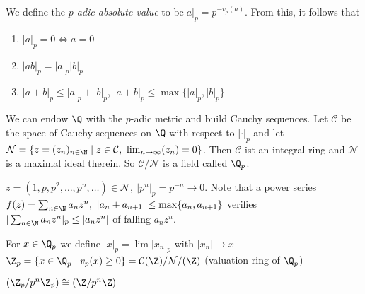 \documentclass{jvfscript}
\begin{document}
	\begin{defn}
		We define the \emph{$p$-adic absolute value} to be$ |a|_p = p^{-v_p(a)} $. From this, it follows that
		\begin{enumerate}
			\item $|a|_p = 0 \iff a = 0$
			\item $ |ab|_p = |a|_p |b|_p $
			\item $|a+b|_p \leq |a|_p+|b|_p$, $|a+b|_p \leq \max\{|a|_p,|b|_p\}$
		\end{enumerate}
	\end{defn}
	We can endow $\Q$ with the $p$-adic metric and build Cauchy sequences. Let $\mathcal{C}$ be the space of Cauchy sequences on $\Q$ with respect to $|\cdot|_p$ and let $\mathcal{N} = \{z = (z_n)_{n \in \N} \mid z \in \mathcal{C},\ \lim_{n \to \infty}(z_n) = 0\}$. Then $\mathcal{C}$ ist an integral ring and $\mathcal{N}$ is a maximal ideal therein. So $\mathcal{C}/\mathcal{N}$ is a field called $\Q_p$.
	\begin{exmp}
		$z = (1,p,p^2,\dotsc,p^n,\dotsc) \in \mathcal{N},\ |p^n|_p = p^{-n} \to 0$. Note that a power series $ f(z) = \sum_{n \in \N} a_n z^n,\ |a_n + a_{n+1}| \leq \max\{a_n,a_{n+1}\} $ verifies $ |\sum_{n \in \N} a_nz^n|_p \leq |a_nz^n| $ of falling $ a_nz^n $.
	\end{exmp}
	\begin{defn}
		For $ x \in \Q_p $ we define $ |x|_p = \lim|x_n|_p $ with $|x_n| \to x$\\
		$ \Z_p = \{x \in \Q_p \mid v_p(x) \geq 0\} = \mathcal{C}(\Z)/\mathcal{N}/(\Z) $ (valuation ring of $\Q_p$)
	\end{defn}	
	$ \left( \Z_p/p^n\Z_p \right) \cong \left( \Z/p^n\Z \right) $
	
	
	
\end{document}

